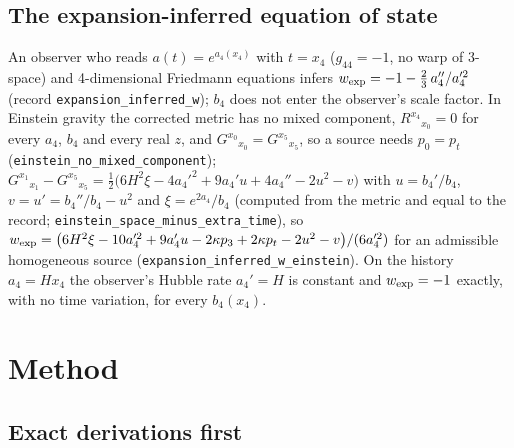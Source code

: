 \documentclass[11pt]{article}
\begin{document}
\subsection{The expansion-inferred equation of state}

An observer who reads $a(t) = e^{a_4(x_4)}$ with $t = x_4$ ($g_{44} = -1$, no warp of 3-space) and 4-dimensional Friedmann equations infers $w_{\rm exp} = -1 - \frac23\,a_4''/a_4'^2$ (record \texttt{expansio\allowbreak{}n\_inferr\allowbreak{}ed\_w}); $b_4$ does not enter the observer's scale factor. In Einstein gravity the corrected metric has no mixed component, $R^{x_4}{}_{x_0} = 0$ for every $a_4$, $b_4$ and every real $z$, and $G^{x_0}{}_{x_0} = G^{x_5}{}_{x_5}$, so a source needs $p_0 = p_t$ (\texttt{einstein\allowbreak{}\_no\_mixe\allowbreak{}d\_compon\allowbreak{}ent}); $G^{x_1}{}_{x_1} - G^{x_5}{}_{x_5} = \frac12\big(6H^2\xi - 4a_4'^2 + 9a_4'u + 4a_4'' - 2u^2 - v\big)$ with $u = b_4'/b_4$, $v = u' = b_4''/b_4 - u^2$ and $\xi = e^{2a_4}/b_4$ (computed from the metric and equal to the record; \texttt{einstein\allowbreak{}\_space\_m\allowbreak{}inus\_ext\allowbreak{}ra\_time}), so $w_{\rm exp} = \big(6H^2\xi - 10a_4'^2 + 9a_4'u - 2\kappa p_3 + 2\kappa p_t - 2u^2 - v\big)/(6a_4'^2)$ for an admissible homogeneous source (\texttt{expansio\allowbreak{}n\_inferr\allowbreak{}ed\_w\_ein\allowbreak{}stein}). On the history $a_4 = Hx_4$ the observer's Hubble rate $a_4' = H$ is constant and $w_{\rm exp} = -1$ exactly, with no time variation, for every $b_4(x_4)$.

\section{Method}

\subsection{Exact derivations first}
\end{document}
